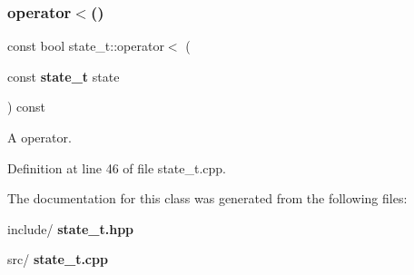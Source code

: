 \mbox{\label{classstate__t_aef60c051e68f523c809033f2e9bdd202}} 
\subsubsection{operator$<$()}
{\footnotesize\ttfamily const bool state\+\_\+t\+::operator$<$ (\begin{DoxyParamCaption}\item[{const \textbf{ state\+\_\+t}}]{state }\end{DoxyParamCaption}) const}



A operator. 



Definition at line 46 of file state\+\_\+t.\+cpp.



The documentation for this class was generated from the following files\+:\begin{DoxyCompactItemize}
\item 
include/\textbf{ state\+\_\+t.\+hpp}\item 
src/\textbf{ state\+\_\+t.\+cpp}\end{DoxyCompactItemize}
